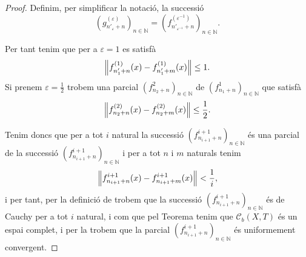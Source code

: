 \documentclass[../../Main.tex]{subfiles}
\begin{document}
\begin{lemma}
\begin{proof}
			Definim, per simplificar la notació, la successió
			\[
			    \left(g^{(\varepsilon)}_{n'_{\varepsilon}+n}\right)_{n\in\mathbb{N}}=\left(f^{(\varepsilon^{-1})}_{n'_{\varepsilon^{-1}}+n}\right)_{n\in\mathbb{N}}.
			\]
			
			Per tant tenim que per a \(\varepsilon=1\) es satisfà
			\[
			    \norm{f^{(1)}_{n'_{1}+n}(x)-f^{(1)}_{n'_{1}+m}(x)}\leq1.
			\]
			Si prenem \(\varepsilon=\frac{1}{2}\) trobem una parcial \((f^{2}_{n_{2}+n})_{n\in\mathbb{N}}\) de \((f^{1}_{n_{1}+n})_{n\in\mathbb{N}}\) que satisfà
			\[
			    \norm{f^{(2)}_{n_{2}+n}(x)-f^{(2)}_{n_{2}+m}(x)}\leq\frac{1}{2}.
			\]
			
			Tenim doncs que per a tot \(i\) natural la successió \((f^{i+1}_{n_{i+1}+n})_{n\in\mathbb{N}}\) és una parcial de la successió \((f^{i+1}_{n_{i+1}+n})_{n\in\mathbb{N}}\) i per a tot \(n\) i \(m\) naturals tenim
			\[
			    \norm{f^{i+1}_{n_{i+1}+n}(x)-f^{i+1}_{n_{i+1}+m}(x)}<\frac{1}{i},
			\]
			i per tant, per la definició de  trobem que la successió \((f^{i+1}_{n_{i+1}+n})_{n\in\mathbb{N}}\) és de Cauchy per a tot \(i\) natural, i com que pel Teorema  tenim que \(\mathcal{C}_{b}(X,T)\) és un espai complet, i per la  trobem que la parcial \((f^{i+1}_{n_{i+1}+n})_{n\in\mathbb{N}}\) és uniformement convergent.
		\end{proof}
	\end{lemma}
\end{document}
